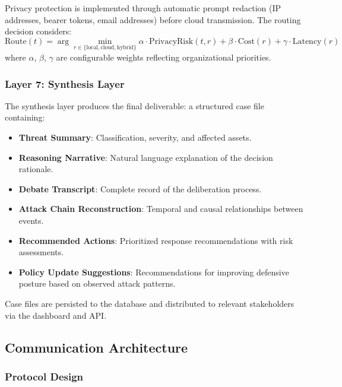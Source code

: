 Privacy protection is implemented through automatic prompt redaction (IP addresses, bearer tokens, email addresses) before cloud transmission. The routing decision considers:
\begin{equation}
\text{Route}(t) = \arg\min_{r \in \{\text{local}, \text{cloud}, \text{hybrid}\}} \alpha \cdot \text{PrivacyRisk}(t, r) + \beta \cdot \text{Cost}(r) + \gamma \cdot \text{Latency}(r)
\end{equation}
where $\alpha$, $\beta$, $\gamma$ are configurable weights reflecting organizational priorities.

\subsubsection{Layer 7: Synthesis Layer}
\label{subsubsec:layer7}

The synthesis layer produces the final deliverable: a structured case file containing:

\begin{itemize}
    \item \textbf{Threat Summary}: Classification, severity, and affected assets.
    \item \textbf{Reasoning Narrative}: Natural language explanation of the decision rationale.
    \item \textbf{Debate Transcript}: Complete record of the deliberation process.
    \item \textbf{Attack Chain Reconstruction}: Temporal and causal relationships between events.
    \item \textbf{Recommended Actions}: Prioritized response recommendations with risk assessments.
    \item \textbf{Policy Update Suggestions}: Recommendations for improving defensive posture based on observed attack patterns.
\end{itemize}

Case files are persisted to the database and distributed to relevant stakeholders via the dashboard and API.

\subsection{Communication Architecture}
\label{subsec:communication}

\subsubsection{Protocol Design}

